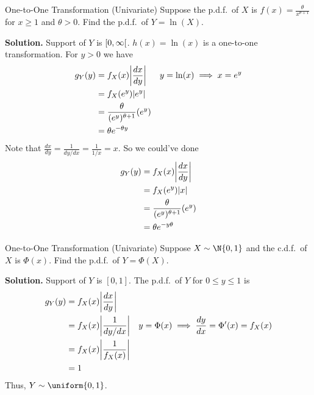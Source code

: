 \begin{Example}{One-to-One Transformation (Univariate)}{}
    Suppose the p.d.f.\ of $ X $ is $ \displaystyle  f(x)=
        \frac{\theta}{x^{\theta+1}} $ for $ x\ge 1 $
    and $ \theta>0. $
    Find the p.d.f.\ of $ Y=\ln(X) $.

    \textbf{Solution.} Support of $ Y $ is $ \interval[open right]{0}{\infty}$.
    $ h(x)=\ln(x) $
    is a one-to-one transformation. For $ y>0 $ we have
    \begin{align*}
        g_Y(y)
         & =f_X(x)\abs*{\frac{dx}{dy}}           & y=\ln (x)\implies x=e^y \\
         & =f_X(e^y)\abs{e^y}                                              \\
         & =\frac{\theta}{(e^y)^{\theta+1}}(e^y)                           \\
         & =\theta e^{-\theta y}
    \end{align*}
    Note that $ \displaystyle \frac{dx}{dy} =\frac{1}{dy/dx}=\frac{1}{1/x}=x $.
    So we could've done
    \begin{align*}
        g_Y(y)
         & =f_X(x)\abs*{\frac{dx}{dy}}           \\
         & =f_X(e^y)\abs{x}                      \\
         & =\frac{\theta}{(e^y)^{\theta+1}}(e^y) \\
         & =\theta e^{-y\theta}
    \end{align*}
\end{Example}
\begin{Example}{One-to-One Transformation (Univariate)}{}
    Suppose $ X \sim \N{0,1} $ and the c.d.f.\ of $ X $ is
    $ \Phi(x) $. Find the p.d.f.\ of $ Y=\Phi(X) $.

    \textbf{Solution.} Support of $ Y $ is $ [0,1] $.
    The p.d.f.\ of $ Y $ for $ 0\le y\le 1 $ is
    \begin{align*}
        g_Y(y)
         & =f_X(x)\abs*{\frac{dx}{dy}}                                       \\
         & =f_X(x)\abs*{\frac{1}{dy/dx}}  & y=\Phi(x)\implies \frac{dy}{dx}=
        \Phi^\prime(x)=f_X(x)                                                \\
         & =f_X(x)\abs*{\frac{1}{f_X(x)}}                                    \\
         & =1
    \end{align*}
    Thus, $ Y \sim \uniform{0,1} $.
\end{Example}
